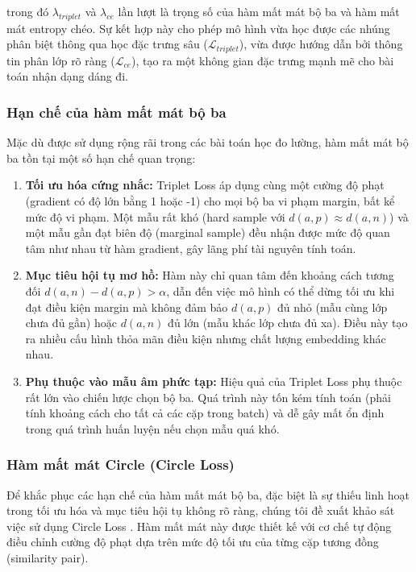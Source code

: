 \noindent trong đó $\lambda_{triplet}$ và $\lambda_{ce}$ lần lượt là trọng số của hàm mất mát bộ ba và hàm mất mát entropy chéo. Sự kết hợp này cho phép mô hình vừa học được các nhúng phân biệt thông qua học đặc trưng sâu ($\mathcal{L}_{triplet}$), vừa được hướng dẫn bởi thông tin phân lớp rõ ràng ($\mathcal{L}_{ce}$), tạo ra một không gian đặc trưng mạnh mẽ cho bài toán nhận dạng dáng đi.



\subsubsection{Hạn chế của hàm mất mát bộ ba}

Mặc dù được sử dụng rộng rãi trong các bài toán học đo lường, hàm mất mát bộ ba tồn tại một số hạn chế quan trọng:

\begin{enumerate}
  \item \textbf{Tối ưu hóa cứng nhắc:} Triplet Loss áp dụng cùng một cường độ phạt (gradient có độ lớn bằng 1 hoặc -1) cho mọi bộ ba vi phạm margin, bất kể mức độ vi phạm. Một mẫu rất khó (hard sample với $d(a,p) \approx d(a,n)$) và một mẫu gần đạt biên độ (marginal sample) đều nhận được mức độ quan tâm như nhau từ hàm gradient, gây lãng phí tài nguyên tính toán.

  \item \textbf{Mục tiêu hội tụ mơ hồ:} Hàm này chỉ quan tâm đến khoảng cách tương đối $d(a,n) - d(a,p) > \alpha$, dẫn đến việc mô hình có thể dừng tối ưu khi đạt điều kiện margin mà không đảm bảo $d(a,p)$ đủ nhỏ (mẫu cùng lớp chưa đủ gần) hoặc $d(a,n)$ đủ lớn (mẫu khác lớp chưa đủ xa). Điều này tạo ra nhiều cấu hình thỏa mãn điều kiện nhưng chất lượng embedding khác nhau.

  \item \textbf{Phụ thuộc vào mẫu âm phức tạp:} Hiệu quả của Triplet Loss phụ thuộc rất lớn vào chiến lược chọn bộ ba. Quá trình này tốn kém tính toán (phải tính khoảng cách cho tất cả các cặp trong batch) và dễ gây mất ổn định trong quá trình huấn luyện nếu chọn mẫu quá khó.
\end{enumerate}

\subsubsection{Hàm mất mát Circle (Circle Loss)}

Để khắc phục các hạn chế của hàm mất mát bộ ba, đặc biệt là sự thiếu linh hoạt trong tối ưu hóa và mục tiêu hội tụ không rõ ràng, chúng tôi đề xuất khảo sát việc sử dụng Circle Loss \cite{circle}. Hàm mất mát này được thiết kế với cơ chế tự động điều chỉnh cường độ phạt dựa trên mức độ tối ưu của từng cặp tương đồng (similarity pair).

